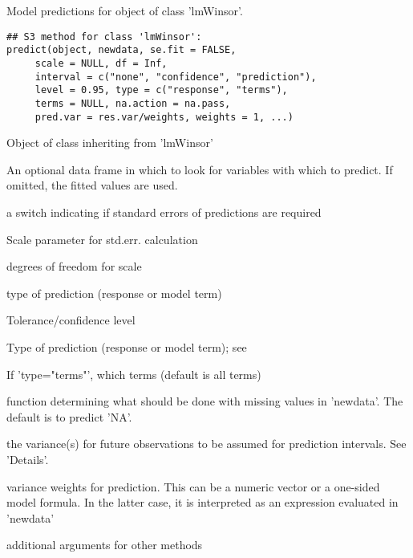 \documentclass{article}
\begin{document}
\begin{Description}\relax
Model predictions for object of class 'lmWinsor'.
\end{Description}
\begin{Usage}
\begin{verbatim}
## S3 method for class 'lmWinsor':
predict(object, newdata, se.fit = FALSE,
     scale = NULL, df = Inf, 
     interval = c("none", "confidence", "prediction"),
     level = 0.95, type = c("response", "terms"), 
     terms = NULL, na.action = na.pass,
     pred.var = res.var/weights, weights = 1, ...)
\end{verbatim}
\end{Usage}
\begin{Arguments}
\begin{ldescription}
\item[\code{ object }] Object of class inheriting from 'lmWinsor'  

\item[\code{ newdata }] An optional data frame in which to look for variables with which to
predict.  If omitted, the fitted values are used. 

\item[\code{ se.fit}] a switch indicating if standard errors of predictions are required 

\item[\code{ scale }] Scale parameter for std.err. calculation  

\item[\code{df}] degrees of freedom for scale 

\item[\code{interval}] type of prediction (response or model term) 

\item[\code{ level }] Tolerance/confidence level 
\item[\code{ type }] Type of prediction (response or model term);  see

\item[\code{terms}] If 'type="terms"', which terms (default is all terms)

\item[\code{na.action}] function determining what should be done with missing values in
'newdata'.  The default is to predict 'NA'. 

\item[\code{ pred.var }] the variance(s) for future observations to be assumed for prediction
intervals.  See  'Details'.

\item[\code{ weights }] variance weights for prediction. This can be a numeric vector or a
one-sided model formula. In the latter case, it is interpreted as an
expression evaluated in 'newdata'

\item[\code{...}] additional arguments for other methods

\end{ldescription}
\end{Arguments}
\end{document}
